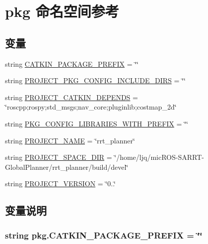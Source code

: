 \hypertarget{namespacepkg}{\section{pkg 命名空间参考}
\label{namespacepkg}
}
\subsection*{变量}
\begin{DoxyCompactItemize}
\item 
string \hyperlink{namespacepkg_ae26c7a5a06b7d738f4d210ca449e6bee}{C\-A\-T\-K\-I\-N\-\_\-\-P\-A\-C\-K\-A\-G\-E\-\_\-\-P\-R\-E\-F\-I\-X} = \char`\"{}\char`\"{}
\item 
string \hyperlink{namespacepkg_a2760bf8266ff58da440f65ee91b203ab}{P\-R\-O\-J\-E\-C\-T\-\_\-\-P\-K\-G\-\_\-\-C\-O\-N\-F\-I\-G\-\_\-\-I\-N\-C\-L\-U\-D\-E\-\_\-\-D\-I\-R\-S} = \char`\"{}\char`\"{}
\item 
string \hyperlink{namespacepkg_a17c18447fad253ee1c0d76deec88028c}{P\-R\-O\-J\-E\-C\-T\-\_\-\-C\-A\-T\-K\-I\-N\-\_\-\-D\-E\-P\-E\-N\-D\-S} = \char`\"{}roscpp;rospy;std\-\_\-msgs;nav\-\_\-core;pluginlib;costmap\-\_\-2d\char`\"{}
\item 
string \hyperlink{namespacepkg_a433e30cecb4a0123a7c4b384d168e336}{P\-K\-G\-\_\-\-C\-O\-N\-F\-I\-G\-\_\-\-L\-I\-B\-R\-A\-R\-I\-E\-S\-\_\-\-W\-I\-T\-H\-\_\-\-P\-R\-E\-F\-I\-X} = \char`\"{}\char`\"{}
\item 
string \hyperlink{namespacepkg_a7dfbe99257c26f5e4a3a5483995d9ddc}{P\-R\-O\-J\-E\-C\-T\-\_\-\-N\-A\-M\-E} = \char`\"{}rrt\-\_\-planner\char`\"{}
\item 
string \hyperlink{namespacepkg_a3f0f1b4bc03c596525e025539ca4332f}{P\-R\-O\-J\-E\-C\-T\-\_\-\-S\-P\-A\-C\-E\-\_\-\-D\-I\-R} = \char`\"{}/home/ljq/mic\-R\-O\-S-\/S\-A\-R\-R\-T-\/Global\-Planner/rrt\-\_\-planner/build/devel\char`\"{}
\item 
string \hyperlink{namespacepkg_ab1037914b9286bb61855131c06149648}{P\-R\-O\-J\-E\-C\-T\-\_\-\-V\-E\-R\-S\-I\-O\-N} = \char`\"{}0..\char`\"{}
\end{DoxyCompactItemize}


\subsection{变量说明}
\hypertarget{namespacepkg_ae26c7a5a06b7d738f4d210ca449e6bee}{
\subsubsection[{C\-A\-T\-K\-I\-N\-\_\-\-P\-A\-C\-K\-A\-G\-E\-\_\-\-P\-R\-E\-F\-I\-X}]{\setlength{\rightskip}{0pt plus 5cm}string pkg.\-C\-A\-T\-K\-I\-N\-\_\-\-P\-A\-C\-K\-A\-G\-E\-\_\-\-P\-R\-E\-F\-I\-X = \char`\"{}\char`\"{}}}\label{namespacepkg_ae26c7a5a06b7d738f4d210ca449e6bee}


